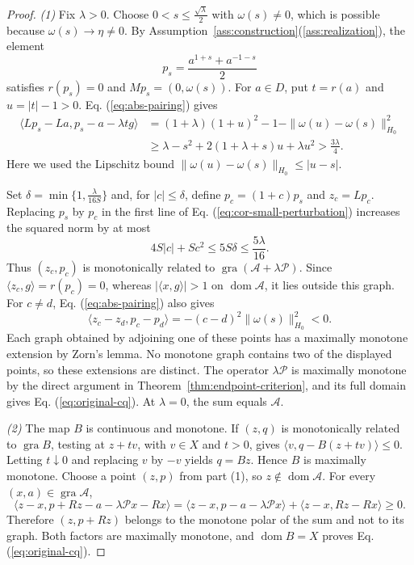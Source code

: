 \documentclass[11pt]{article}
\newcommand{\gra}{\operatorname{gra}}
\newcommand{\dom}{\operatorname{dom}}
\newcommand{\pair}[2]{\langle #1,#2\rangle}
\theoremstyle{definition}
\theoremstyle{remark}
\begin{document}
\begin{proof}
\noindent\textit{(1)} Fix $\lambda>0$. Choose $0<s\le\frac{\sqrt\lambda}{2}$ with $\omega(s)\ne0$, which is possible because $\omega(s)\to\eta\ne0$. By Assumption~\ref{ass:construction}\textup{(\ref{ass:realization})}, the element
\[
p_s=\frac{a^{1+s}+a^{-1-s}}2
\]
satisfies $r(p_s)=0$ and $Mp_s=(0,\omega(s))$. For $a\in D$, put $t=r(a)$ and $u=|t|-1>0$. Eq. (\ref{eq:abs-pairing}) gives
\begin{equation}
\begin{aligned}
\pair{Lp_s-La}{p_s-a-\lambda t g}
&=(1+\lambda)(1+u)^2-1-\|\omega(u)-\omega(s)\|_{H_0}^2\\
&\ge\lambda-s^2+2(1+\lambda+s)u+\lambda u^2
>\frac{3\lambda}{4}.
\end{aligned}
\label{eq:cor-small-perturbation}
\end{equation}
Here we used the Lipschitz bound $\|\omega(u)-\omega(s)\|_{H_0}\le|u-s|$.

Set $\delta=\min\{1,\frac{\lambda}{16S}\}$ and, for $|c|\le\delta$, define $p_c=(1+c)p_s$ and $z_c=Lp_c$. Replacing $p_s$ by $p_c$ in the first line of Eq. (\ref{eq:cor-small-perturbation}) increases the squared norm by at most
\[
4S|c|+Sc^2\le5S\delta\le\frac{5\lambda}{16}.
\]
Thus $(z_c,p_c)$ is monotonically related to $\gra(\mathcal A+\lambda\mathcal P)$. Since $\pair{z_c}{g}=r(p_c)=0$, whereas $|\pair{x}{g}|>1$ on $\dom\mathcal A$, it lies outside this graph. For $c\ne d$, Eq. (\ref{eq:abs-pairing}) also gives
\[
\pair{z_c-z_d}{p_c-p_d}=-(c-d)^2\|\omega(s)\|_{H_0}^2<0.
\]
Each graph obtained by adjoining one of these points has a maximally monotone extension by Zorn's lemma. No monotone graph contains two of the displayed points, so these extensions are distinct. The operator $\lambda\mathcal P$ is maximally monotone by the direct argument in Theorem~\ref{thm:endpoint-criterion}, and its full domain gives Eq. (\ref{eq:original-cq}). At $\lambda=0$, the sum equals $\mathcal A$.

\noindent\textit{(2)} The map $B$ is continuous and monotone. If $(z,q)$ is monotonically related to $\gra B$, testing at $z+tv$, with $v\in X$ and $t>0$, gives $\pair{v}{q-B(z+tv)}\le0$. Letting $t\downarrow0$ and replacing $v$ by $-v$ yields $q=Bz$. Hence $B$ is maximally monotone. Choose a point $(z,p)$ from part (1), so $z\notin\dom\mathcal A$. For every $(x,a)\in\gra\mathcal A$,
\[
\pair{z-x}{p+Rz-a-\lambda\mathcal Px-Rx}
=\pair{z-x}{p-a-\lambda\mathcal Px}+\pair{z-x}{Rz-Rx}\ge0.
\]
Therefore $(z,p+Rz)$ belongs to the monotone polar of the sum and not to its graph. Both factors are maximally monotone, and $\dom B=X$ proves Eq. (\ref{eq:original-cq}).
\end{proof}
\end{document}
